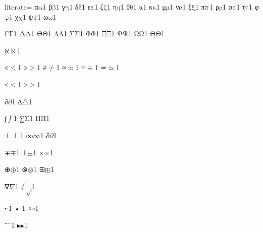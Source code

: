 {%
literate=
{α}{{\ensuremath{\mathrm{\alpha}}}}1
{β}{{\ensuremath{\mathrm{\beta}}}}1
{γ}{{\ensuremath{\mathrm{\gamma}}}}1
{δ}{{\ensuremath{\mathrm{\delta}}}}1
{ε}{{\ensuremath{\mathrm{\varepsilon}}}}1
{ζ}{{\ensuremath{\mathrm{\zeta}}}}1
{η}{{\ensuremath{\mathrm{\eta}}}}1
{θ}{{\ensuremath{\mathrm{\theta}}}}1
{ι}{{\ensuremath{\mathrm{\iota}}}}1
{κ}{{\ensuremath{\mathrm{\kappa}}}}1
{μ}{{\ensuremath{\mathrm{\mu}}}}1
{ν}{{\ensuremath{\mathrm{\nu}}}}1
{ξ}{{\ensuremath{\mathrm{\xi}}}}1
{π}{{\ensuremath{\mathrm{\mathnormal{\pi}}}}}1
{ρ}{{\ensuremath{\mathrm{\rho}}}}1
{σ}{{\ensuremath{\mathrm{\sigma}}}}1
{τ}{{\ensuremath{\mathrm{\tau}}}}1
{φ}{{\ensuremath{\mathrm{\varphi}}}}1
{χ}{{\ensuremath{\mathrm{\chi}}}}1
{ψ}{{\ensuremath{\mathrm{\psi}}}}1
{ω}{{\ensuremath{\mathrm{\omega}}}}1

{Γ}{{\ensuremath{\mathrm{\Gamma}}}}1
{Δ}{{\ensuremath{\mathrm{\Delta}}}}1
{Θ}{{\ensuremath{\mathrm{\Theta}}}}1
{Λ}{{\ensuremath{\mathrm{\Lambda}}}}1
{Σ}{{\ensuremath{\mathrm{\Sigma}}}}1
{Φ}{{\ensuremath{\mathrm{\Phi}}}}1
{Ξ}{{\ensuremath{\mathrm{\Xi}}}}1
{Ψ}{{\ensuremath{\mathrm{\Psi}}}}1
{Ω}{{\ensuremath{\mathrm{\Omega}}}}1
{Θ}{{\ensuremath{\mathrm{\Theta}}}}1

{ℵ}{{\ensuremath{\aleph}}}1

{≤}{{\ensuremath{\leq}}}1
{≥}{{\ensuremath{\geq}}}1
{≠}{{\ensuremath{\neq}}}1
{≈}{{\ensuremath{\approx}}}1
{≡}{{\ensuremath{\equiv}}}1
{≃}{{\ensuremath{\simeq}}}1

{≤}{{\ensuremath{\leq}}}1
{≥}{{\ensuremath{\geq}}}1

{∂}{{\ensuremath{\partial}}}1
{∆}{{\ensuremath{\triangle}}}1 %

{∫}{{\ensuremath{\int}}}1
{∑}{{\ensuremath{\mathrm{\Sigma}}}}1
{Π}{{\ensuremath{\mathrm{\Pi}}}}1

{⊥}{{\ensuremath{\perp}}}1
{∞}{{\ensuremath{\infty}}}1
{∂}{{\ensuremath{\partial}}}1

{∓}{{\ensuremath{\mp}}}1
{±}{{\ensuremath{\pm}}}1
{×}{{\ensuremath{\times}}}1

{⊕}{{\ensuremath{\oplus}}}1
{⊗}{{\ensuremath{\otimes}}}1
{⊞}{{\ensuremath{\boxplus}}}1

{∇}{{\ensuremath{\nabla}}}1
{√}{{\ensuremath{\sqrt}}}1

{⬝}{{\ensuremath{\cdot}}}1
{•}{{\ensuremath{\cdot}}}1
{∘}{{\ensuremath{\circ}}}1

{⁻}{{\ensuremath{^{-}}}}1
{▸}{{\ensuremath{\blacktriangleright}}}1

}

